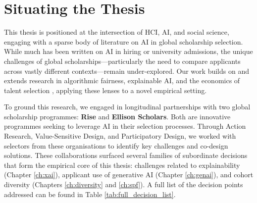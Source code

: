 \section{Situating the Thesis}\label{sec:context_situating}

This thesis is positioned at the intersection of HCI, AI, and social science, engaging with a sparse body of literature on AI in global scholarship selection. While much has been written on AI in hiring or university admissions, the unique challenges of global scholarships—particularly the need to compare applicants across vastly different contexts—remain under-explored. Our work builds on and extends research in algorithmic fairness, explainable AI, and the economics of talent selection \cite{kleinberg2018algorithmic, li2020hiring}, applying these lenses to a novel empirical setting.

To ground this research, we engaged in longitudinal partnerships with two global scholarship programmes: \textbf{Rise} and \textbf{Ellison Scholars}. Both are innovative programmes seeking to leverage AI in their selection processes. Through Action Research, Value-Sensitive Design, and Participatory Design, we worked with selectors from these organisations to identify key challenges and co-design solutions. These collaborations surfaced several families of subordinate decisions that form the empirical core of this thesis: challenges related to explainability (Chapter \ref{ch:xai}), applicant use of generative AI (Chapter \ref{ch:genai}), and cohort diversity (Chapters \ref{ch:diversity} and \ref{ch:spf}). A full list of the decision points addressed can be found in Table \ref{tab:full_decision_list}.

